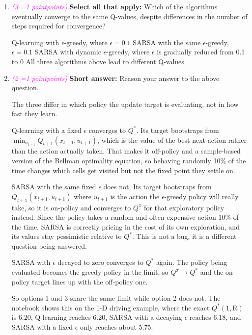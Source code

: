 \documentclass[11pt, letter, answers]{exam}
\newcommand{\grade}[1]{
    \small\textcolor{magenta}{\emph{(#1 \ifnum#1=1 point\else points\fi)}}%
    \normalsize
}
\newcommand{\sAll}{\textbf{Select all that apply: }}
\newcommand{\saq}{\textbf{Short answer: }}
\begin{document}
\begin{enumerate}[label=(\alph*), resume]

\item \grade{3} \sAll Which of the algorithms eventually converge to the same Q-values, despite differences in the number of steps required for convergence?
{
\checkboxchar{$\Box$} \checkedchar{$\blacksquare$}  %
\begin{checkboxes}
    \CorrectChoice Q-learning with $\epsilon$-greedy, where $\epsilon = 0.1$
    \choice SARSA with the same $\epsilon$-greedy, $\epsilon = 0.1$
    \CorrectChoice SARSA with dynamic $\epsilon$-greedy, where $\epsilon$ is gradually reduced from 0.1 to 0
    \choice All three algorithms above lead to different Q-values
\end{checkboxes}
}


\item \grade{2} \saq Reason your answer to the above question.
\begin{answerBox}[height=4in]
The three differ in which policy the update target is evaluating, not in how fast they learn.

Q-learning with a fixed $\epsilon$ converges to $Q^*$. Its target bootstraps from $\min_{u_{t+1}} Q_{t+1}(x_{t+1}, u_{t+1})$, which is the value of the best next action rather than the action actually taken. That makes it off-policy and a sample-based version of the Bellman optimality equation, so behaving randomly 10\% of the time changes which cells get visited but not the fixed point they settle on.

SARSA with the same fixed $\epsilon$ does not. Its target bootstraps from $Q_{t+1}(x_{t+1}, u_{t+1})$ where $u_{t+1}$ is the action the $\epsilon$-greedy policy will really take, so it is on-policy and converges to $Q^\pi$ for that exploratory policy instead. Since the policy takes a random and often expensive action 10\% of the time, SARSA is correctly pricing in the cost of its own exploration, and its values stay pessimistic relative to $Q^*$. This is not a bug, it is a different question being answered.

SARSA with $\epsilon$ decayed to zero converges to $Q^*$ again. The policy being evaluated becomes the greedy policy in the limit, so $Q^\pi \to Q^*$ and the on-policy target lines up with the off-policy one.

So options 1 and 3 share the same limit while option 2 does not. The notebook shows this on the 1-D driving example, where the exact $Q^*(1,\text{R})$ is 6.20, Q-learning reaches 6.20, SARSA with a decaying $\epsilon$ reaches 6.18, and SARSA with a fixed $\epsilon$ only reaches about 5.75.
\end{answerBox}


\end{enumerate}
\end{document}
